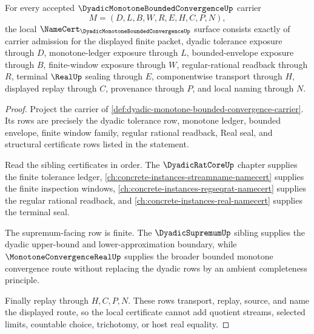 \begin{theorem}
\label{thm:dyadic-monotone-bounded-convergence-namecert-obligations}
For every accepted $\DyadicMonotoneBoundedConvergenceUp$ carrier
$$
M=(D,L,B,W,R,E,H,C,P,N),
$$
the local $\NameCert_{\DyadicMonotoneBoundedConvergenceUp}$ surface consists exactly of carrier admission for the displayed finite packet, dyadic tolerance exposure through $D$, monotone-ledger exposure through $L$, bounded-envelope exposure through $B$, finite-window exposure through $W$, regular-rational readback through $R$, terminal $\RealUp$ sealing through $E$, componentwise transport through $H$, displayed replay through $C$, provenance through $P$, and local naming through $N$.
\end{theorem}
\begin{proof}
Project the carrier of \autoref{def:dyadic-monotone-bounded-convergence-carrier}. Its rows are precisely the dyadic tolerance row, monotone ledger, bounded envelope, finite window family, regular rational readback, Real seal, and structural certificate rows listed in the statement.

Read the sibling certificates in order. The $\DyadicRatCoreUp$ chapter supplies the finite tolerance ledger, \autoref{ch:concrete-instances-streamname-namecert} supplies the finite inspection windows, \autoref{ch:concrete-instances-regseqrat-namecert} supplies the regular rational readback, and \autoref{ch:concrete-instances-real-namecert} supplies the terminal seal.

The supremum-facing row is finite. The $\DyadicSupremumUp$ sibling supplies the dyadic upper-bound and lower-approximation boundary, while $\MonotoneConvergenceRealUp$ supplies the broader bounded monotone convergence route without replacing the dyadic rows by an ambient completeness principle.

Finally replay through $H,C,P,N$. These rows transport, replay, source, and name the displayed route, so the local certificate cannot add quotient streams, selected limits, countable choice, trichotomy, or host real equality.
\end{proof}

